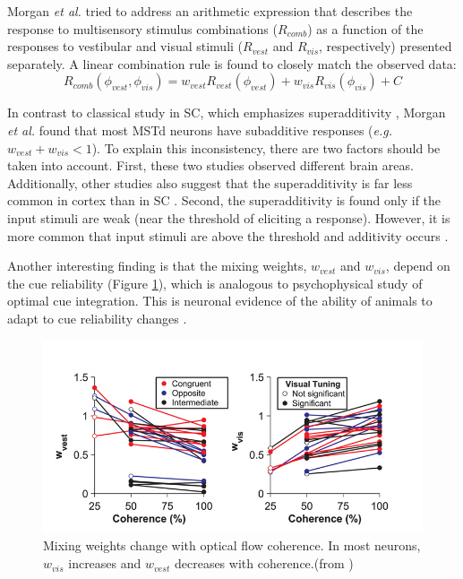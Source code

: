 \documentclass{article}[11pt]
\newcommand{\etal}{\textit{et al. }}
\newcommand{\eg}{\textit{e.g. }}
\begin{document}
Morgan \etal tried to address an arithmetic expression that describes the response to multisensory stimulus combinations ($R_{comb}$) as a function of the responses to vestibular and visual stimuli ($R_{vest}$ and $R_{vis}$, respectively) presented separately. A linear combination rule is found to closely match the observed data:
\begin{equation}
  R_{comb}(\phi_{vest}, \phi_{vis}) = w_{vest} R_{vest}(\phi_{vest}) + w_{vis} R_{vis}(\phi_{vis}) + C 
  \label{eq:lincomb}
\end{equation}

In contrast to classical study in SC, which emphasizes superadditivity \cite{meredith_visual_1986}, Morgan \etal found that most MSTd neurons have subadditive responses (\eg $w_{vest} + w_{vis} < 1$). To explain this inconsistency, there are two factors should be taken into account. First, these two studies observed different brain areas. Additionally, other studies also suggest that the superadditivity is far less common in cortex than in SC \cite{alais_multisensory_2010}. Second, the superadditivity is found only if the input stimuli are weak (near the threshold of eliciting a response). However, it is more common that input stimuli are above the threshold and additivity occurs \cite{stanford_evaluating_2005}.

Another interesting finding is that the mixing weights, $w_{vest}$ and $w_{vis}$, depend on the cue reliability (Figure \ref{fig:weight}), which is analogous to psychophysical study of optimal cue integration.
This is neuronal evidence of the ability of animals to adapt to cue reliability changes .

\begin{figure}[tpbh]
  \centering
  \includegraphics[width=.7\textwidth]{weight}
  \caption{Mixing weights change with optical flow coherence. In most neurons, $w_{vis}$ increases and $w_{vest}$ decreases with coherence.(from \cite{morgan_multisensory_2008})}
  \label{fig:weight}
\end{figure}
\end{document}
